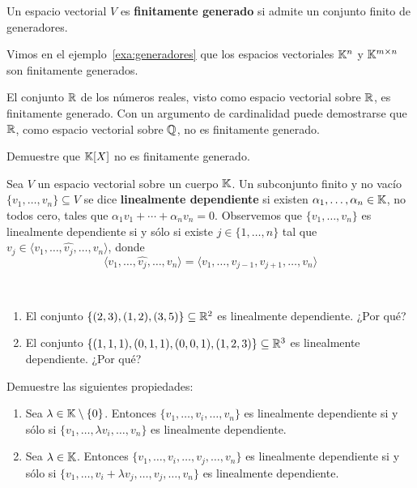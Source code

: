 \begin{block}
	Un espacio vectorial $V$ es \textbf{finitamente generado} si admite un
	conjunto finito de generadores. 
\end{block}

\begin{examples}
	Vimos en el ejemplo~\ref{exa:generadores} que los espacios vectoriales
	$\mathbb{K}^n$ y $\mathbb{K}^{m\times n}$ son finitamente generados. 
\end{examples}

\begin{block}
    El conjunto $\mathbb{R}$ de los números reales, visto como espacio vectorial sobre
    $\mathbb{R}$, es finitamente generado. Con un argumento de
    cardinalidad puede demostrarse que $\mathbb{R}$, como espacio vectorial sobre $\mathbb{Q}$, no es
    finitamente generado.
\end{block}

\begin{xca}
	\label{xca:K[X]_no_fg}
	Demuestre que $\mathbb{K}[X]$ no es finitamente generado.	
\end{xca}

\begin{block}
    Sea $V$ un espacio vectorial sobre un cuerpo $\mathbb{K}$.  Un subconjunto finito y
    no vacío $\{v_1,\dots,v_n\}\subseteq V$ se dice \textbf{linealmente
    dependiente} si existen $\alpha_1,\dots,\alpha_n\in\mathbb{K}$, no todos cero,
    tales que $\alpha_1v_1+\cdots+\alpha_nv_n=0$. Observemos que
    $\{v_1,\dots,v_n\}$ es linealmente dependiente si y sólo si existe
    $j\in\{1,\dots,n\}$ tal que $v_j\in\langle
    v_1,\dots,\widehat{v_j},\dots,v_n\rangle$, donde 
	\[
	\langle v_1,\dots,\widehat{v_j},\dots,v_n\rangle=
	\langle v_1,\dots,v_{j-1},v_{j+1},\dots,v_n\rangle
	\]
\end{block}

\begin{examples}\
	\begin{enumerate}
		\item El conjunto $\{(2,3),(1,2),(3,5)\}\subseteq\mathbb{R}^2$ es linealmente
			dependiente. ¿Por qué?
		\item El conjunto $\{(1,1,1),(0,1,1),(0,0,1),(1,2,3)\}\subseteq\mathbb{R}^3$
			es linealmente dependiente. ¿Por qué?
	\end{enumerate}
\end{examples}

\begin{xca}
	Demuestre las siguientes propiedades:
	\begin{enumerate}
		\item Sea $\lambda\in\mathbb{K}\setminus\{0\}$. Entonces
			$\{v_1,\dots,v_i,\dots,v_n\}$ es linealmente dependiente si y sólo
			si $\{v_1,\dots,\lambda v_i,\dots,v_n\}$ es linealmente
			dependiente. 
		\item Sea $\lambda\in\mathbb{K}$. Entonces
			$\{v_1,\dots,v_i,\dots,v_j,\dots,v_n\}$ es linealmente dependiente
			si y sólo si $\{v_1,\dots,v_i+\lambda v_j,\dots,v_j,\dots,v_n\}$ es
			linealmente dependiente.
	\end{enumerate}
\end{xca}

